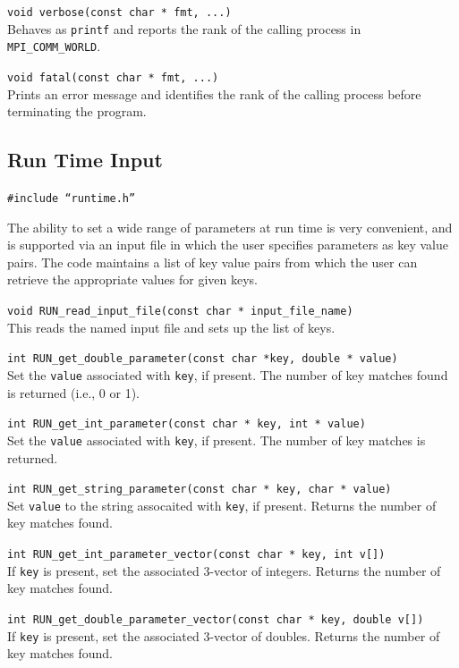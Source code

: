 \texttt{void verbose(const char * fmt, ...)}\\
Behaves as \texttt{printf} and reports the rank of the
calling process in \texttt{MPI\_COMM\_WORLD}.

\texttt{void fatal(const char * fmt, ...)}\\
Prints an error message and identifies
the rank of the calling process before terminating the program.


\subsection{Run Time Input}

\texttt{\#include ``runtime.h''}

The ability to set a wide range of parameters at run time is
very convenient, and is supported via an input file in which the
user specifies parameters as key value pairs. The code maintains
a list of key value pairs from which the user can retrieve the
appropriate values for given keys.


\texttt{void RUN\_read\_input\_file(const char * input\_file\_name)}\\
This reads the named input file and sets up the list of keys.

\texttt{int RUN\_get\_double\_parameter(const char *key, double * value)}\\
Set the \texttt{value} associated with \texttt{key}, if present. The number
of key matches found is returned (i.e., 0 or 1).

\texttt{int RUN\_get\_int\_parameter(const char * key, int * value)}\\
Set the \texttt{value} associated with \texttt{key}, if present. The
number of key matches is returned.

\texttt{int  RUN\_get\_string\_parameter(const char * key, char * value)}\\
Set \texttt{value} to the string assocaited with \texttt{key}, if
present. Returns the number of key matches found.

\texttt{int  RUN\_get\_int\_parameter\_vector(const char * key, int v[])}\\
If \texttt{key} is present, set the associated 3-vector of integers.
Returns the number of key matches found. 

\texttt{int  RUN\_get\_double\_parameter\_vector(const char * key,
double v[])}\\
If \texttt{key} is present, set the associated 3-vector of doubles.
Returns the number of key matches found.

